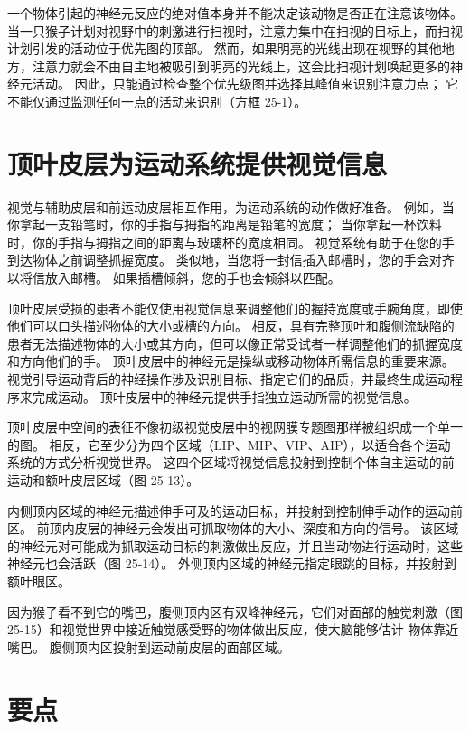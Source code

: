一个物体引起的神经元反应的绝对值本身并不能决定该动物是否正在注意该物体。
当一只猴子计划对视野中的刺激进行扫视时，注意力集中在扫视的目标上，而扫视计划引发的活动位于优先图的顶部。
然而，如果明亮的光线出现在视野的其他地方，注意力就会不由自主地被吸引到明亮的光线上，这会比扫视计划唤起更多的神经元活动。
因此，只能通过检查整个优先级图并选择其峰值来识别注意力点；
它不能仅通过监测任何一点的活动来识别（方框 25-1）。



\section{顶叶皮层为运动系统提供视觉信息}

视觉与辅助皮层和前运动皮层相互作用，为运动系统的动作做好准备。
例如，当你拿起一支铅笔时，你的手指与拇指的距离是铅笔的宽度；
当你拿起一杯饮料时，你的手指与拇指之间的距离与玻璃杯的宽度相同。
视觉系统有助于在您的手到达物体之前调整抓握宽度。
类似地，当您将一封信插入邮槽时，您的手会对齐以将信放入邮槽。
如果插槽倾斜，您的手也会倾斜以匹配。


顶叶皮层受损的患者不能仅使用视觉信息来调整他们的握持宽度或手腕角度，即使他们可以口头描述物体的大小或槽的方向。
相反，具有完整顶叶和腹侧流缺陷的患者无法描述物体的大小或其方向，但可以像正常受试者一样调整他们的抓握宽度和方向他们的手。
顶叶皮层中的神经元是操纵或移动物体所需信息的重要来源。
视觉引导运动背后的神经操作涉及识别目标、指定它们的品质，并最终生成运动程序来完成运动。
顶叶皮层中的神经元提供手指独立运动所需的视觉信息。


顶叶皮层中空间的表征不像初级视觉皮层中的视网膜专题图那样被组织成一个单一的图。
相反，它至少分为四个区域（LIP、MIP、VIP、AIP），以适合各个运动系统的方式分析视觉世界。
这四个区域将视觉信息投射到控制个体自主运动的前运动和额叶皮层区域（图 25-13）。


内侧顶内区域的神经元描述伸手可及的运动目标，并投射到控制伸手动作的运动前区。
前顶内皮层的神经元会发出可抓取物体的大小、深度和方向的信号。
该区域的神经元对可能成为抓取运动目标的刺激做出反应，并且当动物进行运动时，这些神经元也会活跃（图 25-14）。
外侧顶内区域的神经元指定眼跳的目标，并投射到额叶眼区。


因为猴子看不到它的嘴巴，腹侧顶内区有双峰神经元，它们对面部的触觉刺激（图 25-15）和视觉世界中接近触觉感受野的物体做出反应，使大脑能够估计 物体靠近嘴巴。
腹侧顶内区投射到运动前皮层的面部区域。




\section{要点}

